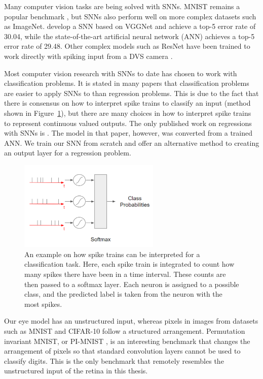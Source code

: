 \documentclass [MS] {UCLAthesis}
\begin{document}
Many computer vision tasks are being solved with SNNs. MNIST remains a popular benchmark \citep{10.3389/fncom.2015.00099}, but SNNs also perform well on more complex datasets such as ImageNet. \citet{10.3389/fnins.2019.00095} develop a SNN based on VGGNet and achieve a top-5 error rate of 30.04, while the state-of-the-art artificial neural network (ANN) achieves a top-5 error rate of 29.48. Other complex models such as ResNet have been trained to work directly with spiking input from a DVS camera \citep{resnet_events}.

Most computer vision research with SNNs to date has chosen to work with classification problems. It is stated in many papers that classification problems are easier to apply SNNs to than regression problems. This is due to the fact that there is consensus on how to interpret spike trains to classify an input (method shown in Figure~\ref{fig:snn_classifier}), but there are many choices in how to interpret spike trains to represent continuous valued outputs. The only published work on regressions with SNNs is \citet{regression_steering}. The model in that paper, however, was converted from a trained ANN. We train our SNN from scratch and offer an alternative method to creating an output layer for a regression problem.

\begin{figure}
    \centering
    \includegraphics[width=0.6\textwidth]{snn_classifier}
    \caption[Interpreting spike trains to classify inputs]{An example on how spike trains can be interpreted for a classification task. Here, each spike train is integrated to count how many spikes there have been in a time interval. These counts are then passed to a softmax layer. Each neuron is assigned to a possible class, and the predicted label is taken from the neuron with the most spikes. }
    \label{fig:snn_classifier}
\end{figure}

Our eye model has an unstructured input, whereas pixels in images from datasets such as MNIST and CIFAR-10 follow a structured arrangement. Permutation invariant MNIST, or PI-MNIST \cite{le2015simple}, is an interesting benchmark that changes the arrangement of pixels so that standard convolution layers cannot be used to classify digits. This is the only benchmark that remotely resembles the unstructured input of the retina in this thesis.
\end{document}
